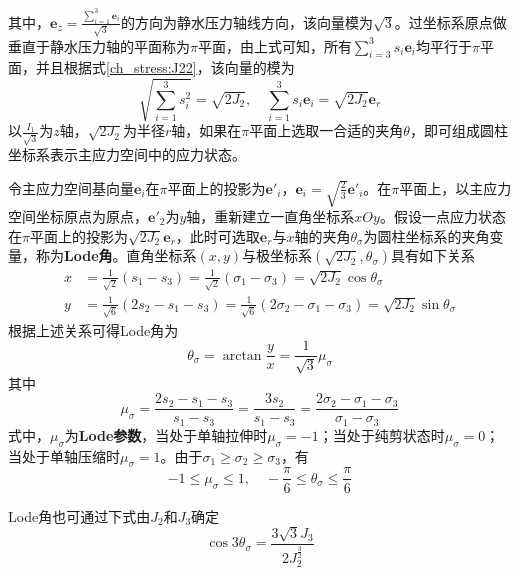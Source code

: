 其中，$\boldsymbol e_z = \frac{\sum_{i=1}^3\boldsymbol e_i}{\sqrt 3}$的方向为静水压力轴线方向，该向量模为$\sqrt{3}$。过坐标系原点做垂直于静水压力轴的平面称为$\pi$平面，由上式可知，所有$\sum_{i=3}^3 s_i \boldsymbol e_i$均平行于$\pi$平面，并且根据式\eqref{ch_stress:J22}，该向量的模为
\begin{equation}
    \sqrt{\sum_{i=1}^3 s_i^2} = \sqrt{2J_2},\quad \sum_{i=1}^3 s_i \boldsymbol e_i = \sqrt{2J_2} \boldsymbol e_r
\end{equation}
以$\frac{I_1}{\sqrt 3}$为$z$轴，$\sqrt{2J_2}$为半径$r$轴，如果在$\pi$平面上选取一合适的夹角$\theta$，即可组成圆柱坐标系表示主应力空间中的应力状态。\par
令主应力空间基向量$\boldsymbol e_i$在$\pi$平面上的投影为$\boldsymbol e'_i$，$\boldsymbol e_i = \sqrt{\frac{2}{3}} \boldsymbol e'_i$。在$\pi$平面上，以主应力空间坐标原点为原点，$\boldsymbol e'_2$为$y$轴，重新建立一直角坐标系$xOy$。假设一点应力状态在$\pi$平面上的投影为$\sqrt{2J_2}\boldsymbol e_r$，此时可选取$\boldsymbol e_r$与$x$轴的夹角$\theta_\sigma$为圆柱坐标系的夹角变量，称为\textbf{Lode角}。直角坐标系$(x,y)$与极坐标系$(\sqrt{2J_2},\theta_\sigma)$具有如下关系
\begin{subequations}\label{ch_J2:xy}
\begin{align}
    x &= \frac{1}{\sqrt 2}(s_1-s_3) = \frac{1}{\sqrt 2}(\sigma_1-\sigma_3) = \sqrt{2J_2}\cos \theta_\sigma \\
    y &= \frac{1}{\sqrt 6}(2s_2-s_1-s_3) = \frac{1}{\sqrt 6}(2\sigma_2-\sigma_1-\sigma_3) = \sqrt{2J_2} \sin \theta_\sigma
\end{align}
\end{subequations}
根据上述关系可得Lode角为
\begin{equation}
    \theta_\sigma = \arctan \frac{y}{x} = \frac{1}{\sqrt 3} \mu_\sigma
\end{equation}
其中
\begin{equation}
\mu_\sigma = \frac{2s_2-s_1-s_3}{s_1-s_3} = \frac{3s_2}{s_1-s_3} = \frac{2\sigma_2-\sigma_1-\sigma_3}{\sigma_1-\sigma_3}
\end{equation}
式中，$\mu_\sigma$为\textbf{Lode参数}，当处于单轴拉伸时$\mu_\sigma=-1$；当处于纯剪状态时$\mu_\sigma=0$；当处于单轴压缩时$\mu_\sigma=1$。由于$\sigma_1\ge\sigma_2\ge\sigma_3$，有
\begin{equation}
-1 \le \mu_\sigma \le 1, \quad - \frac{\pi}{6} \le \theta_\sigma \le \frac{\pi}{6}
\end{equation}\par
Lode角也可通过下式由$J_2$和$J_3$确定
\begin{equation}
\cos3\theta_\sigma = \frac{3\sqrt 3 J_3}{2 J_2^{\frac{3}{2}}}
\end{equation}\par
